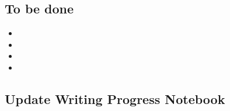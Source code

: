\documentclass[10pt,letterpaper]{article}
\newcommand{\bi}{\begin{itemize}}
\newcommand{\ei}{\end{itemize}}
\begin{document}
\begin{description}


\subsection{To be done}
\label{sub:to-do}


\bi
\item 
\item 
\item 
\item 
\ei




\subsection{Update Writing Progress Notebook}
\label{sub:WPsheet}








\end{description}
\end{document}

